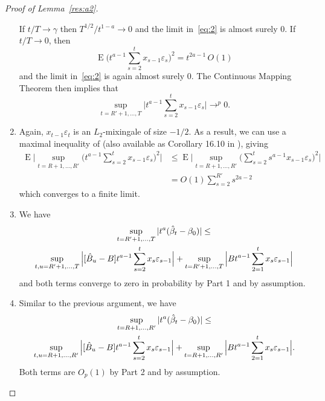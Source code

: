 \documentclass[12pt,fleqn]{article}
\theoremstyle{definition}
\DeclareMathOperator{\E}{E}
\newcommand{\btrue}[1][]{\if#1*\hat\beta_{T+1}\else\beta_0\fi}
\newcommand{\ep}{\varepsilon}
\begin{document}
\begin{proof}[Proof of Lemma~\ref{res:a2}]
\begin{enumerate}
    If $t/T \to \gamma$ then $T^{1/2} / t^{1-a} \to 0$ and the limit
    in~\eqref{eq:2} is almost surely 0. If $t/T \to 0$, then
    \begin{equation*}
      \E\Big( t^{a - 1} \sum_{s=2}^t x_{s-1} \ep_s \Big)^2 = t^{2a - 1}\, O(1)
    \end{equation*}
    and the limit in~\eqref{eq:2} is again almost surely 0. The
    Continuous Mapping Theorem then implies that
    \begin{equation*}
      \sup_{t=R'+1,\dots,T} \Big| t^{a - 1} \sum_{s=2}^t x_{s-1} \ep_s \Big| \to^p 0.
    \end{equation*}
  \item Again, $x_{t-1} \ep_t$ is an $L_2$-mixingale of size
    $-1/2$. As a result, we can use a maximal inequality of
    \cite{Mcl:75} (also available as Corollary 16.10 in
    \citealp{Dav:94}), giving
    \begin{align*}
      \E \Big\lvert \sup_{t=R+1,\dots,R'} \Big(t^{a - 1} \sum_{s=2}^t x_{s-1} \ep_s\Big)^2 \Big\rvert
      &\leq \E \Big\lvert \sup_{t=R+1,\dots,R'} \Big(\sum_{s=2}^t s^{a-1} x_{s-1} \ep_s\Big)^2 \Big\rvert \\
      &= O(1) \sum_{s=2}^{R'} s^{2a - 2}
    \end{align*}
    which converges to a finite limit.
  \item We have
    \begin{multline*}
      \sup_{t=R'+1,\dots,T} | t^a (\hat{\beta}_t - \btrue) | \leq \\
      \sup_{t,u =R'+1,\dots,T} \Big| [ \hat{B}_u - B]
      t^{a-1} \sum_{s=2}^t x_s \ep_{s-1} \Big| + \sup_{t = R'+1,\dots,T} \Big|
      B t^{a-1} \sum_{2=1}^t x_s \ep_{s-1} \Big|
    \end{multline*}
    and both terms converge to zero in probability by Part 1 and by
    assumption.
  \item Similar to the previous argument, we have
    \begin{multline*}
      \sup_{t=R+1,\dots,R'} | t^a (\hat{\beta}_t - \btrue) | \leq \\
      \sup_{t,u =R+1,\dots,R'} \Big| [ \hat{B}_u - B]
      t^{a-1} \sum_{s=2}^t x_s \ep_{s-1} \Big| + \sup_{t = R+1,\dots,R'} \Big|
      B t^{a-1} \sum_{2=1}^t x_s \ep_{s-1} \Big|.
    \end{multline*}
    Both terms are $O_p(1)$ by Part 2 and by assumption. \qedhere
  \end{enumerate}
\end{proof}
\end{document}
